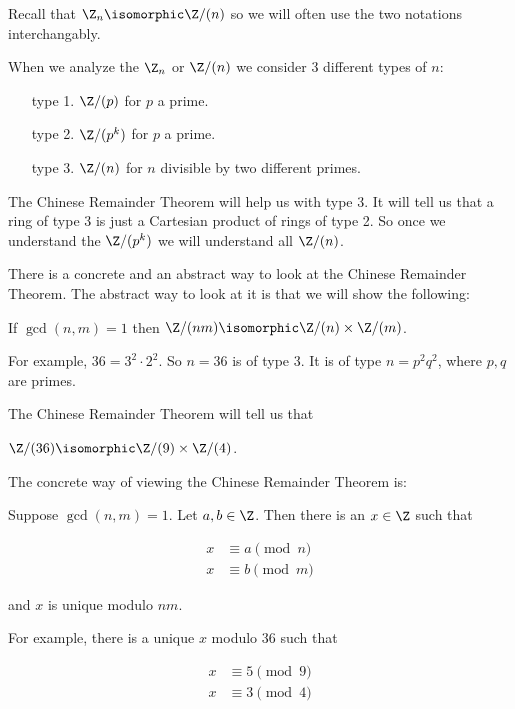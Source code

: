 \documentclass[oneside,12pt]{amsart}
\begin{document}
Recall that $\Z_n\isomorphic \Z/(n)$ so we will often use the two notations interchangably.

When we analyze the $\Z_n$ or $\Z/(n)$ we consider 3 different types of $n$:
\begin{enumerate}
\item[type 1.] $\Z/(p)$ for $p$ a prime.
\item[type 2.]  $\Z/(p^k)$ for $p$ a prime.
\item[type 3.] $\Z/(n)$ for $n$ divisible by two different primes.
\end{enumerate}

The Chinese Remainder Theorem will help us with type 3. It will tell us that
a ring of type 3 is just a Cartesian product of rings of type 2. So once we 
understand the $\Z/(p^k)$ we will understand all $\Z/(n)$.

There is a concrete and an abstract way to look at the Chinese Remainder Theorem.
The abstract way to look at it is that we will show the following:

\bigskip

If $\gcd(n,m)=1$ then $\Z/(nm)\isomorphic \Z/(n) \times \Z/(m)$.

\bigskip

For example, $36=3^2\cdot 2^2$. So $n=36$ is of type 3. It is of type
$n=p^2q^2$, where $p,q$ are primes.

The Chinese Remainder Theorem will tell us that

$\Z/(36) \isomorphic \Z/(9) \times \Z/(4)$.

\bigskip

The concrete way of viewing the Chinese Remainder Theorem is:

\bigskip

Suppose $\gcd(n,m) = 1$. Let $a,b\in\Z$. Then there is an $x\in \Z$ such that

\begin{align*}
x &\equiv a \pmod n\\
x &\equiv b \pmod m
\end{align*}

and $x$ is unique modulo $nm$.

\bigskip

For example, there is a unique $x$ modulo 36 such that

\begin{align*}
x &\equiv 5 \pmod 9 \\
x &\equiv 3 \pmod 4 \\
\end{align*}
\end{document}
